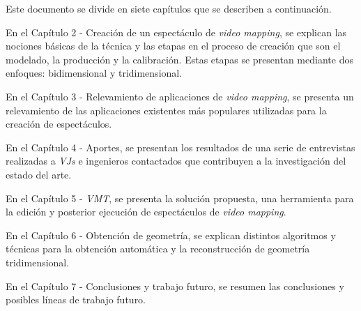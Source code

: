 Este documento se divide en siete capítulos que se describen a continuación.

En el Capítulo 2 - Creación de un espectáculo de \emph{video mapping}, se explican las nociones básicas de la técnica y las etapas en el proceso de creación que son el modelado, la producción y la calibración. Estas etapas se presentan mediante dos enfoques: bidimensional y tridimensional.

En el Capítulo 3 - Relevamiento de aplicaciones de \emph{video mapping}, se presenta un relevamiento de las aplicaciones existentes más populares utilizadas para la creación de espectáculos.

En el Capítulo 4 - Aportes, se presentan los resultados de una serie de entrevistas realizadas a \emph{VJs} e ingenieros contactados que contribuyen a la investigación del estado del arte.

En el Capítulo 5 - \emph{VMT}, se presenta la solución propuesta, una herramienta para la edición y posterior ejecución de espectáculos de \emph{video mapping}.

En el Capítulo 6 - Obtención de geometría, se explican distintos algoritmos y técnicas para la obtención automática y la reconstrucción de geometría tridimensional.

En el Capítulo 7 - Conclusiones y trabajo futuro, se resumen las conclusiones y posibles líneas de trabajo futuro.
